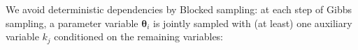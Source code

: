 We avoid deterministic dependencies by Blocked sampling:
at each step of Gibbs sampling, a parameter variable $\boldsymbol\theta_i$ is 
jointly sampled with  
(at least) one auxiliary variable $k_j$ 
conditioned on the remaining variables:
